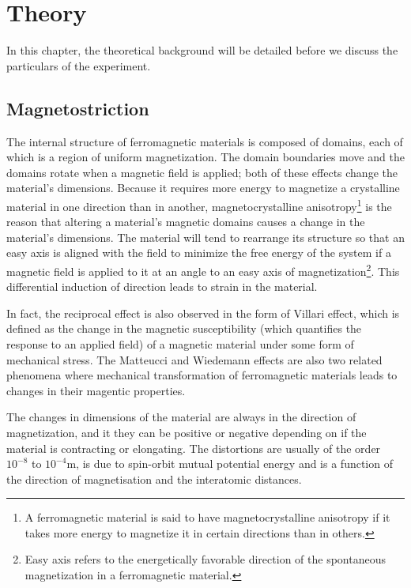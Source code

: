 \chapter{\label{method}Theory}
In this chapter, the theoretical background will be detailed before we discuss the particulars of the experiment.
\section{Magnetostriction}
The internal structure of ferromagnetic materials is composed of domains, each of which is a region of uniform magnetization. The domain boundaries move and the domains rotate when a magnetic field is applied; both of these effects change the material's dimensions. Because it requires more energy to magnetize a crystalline material in one direction than in another, magnetocrystalline anisotropy\footnote{A ferromagnetic material is said to have magnetocrystalline anisotropy if it takes more energy to magnetize it in certain directions than in others.} is the reason that altering a material's magnetic domains causes a change in the material's dimensions. The material will tend to rearrange its structure so that an easy axis is aligned with the field to minimize the free energy of the system if a magnetic field is applied to it at an angle to an easy axis of magnetization\footnote{Easy axis refers to the energetically favorable direction of the spontaneous magnetization in a ferromagnetic material.}. This differential induction of direction leads to strain in the material.

In fact, the reciprocal effect is also observed in the form of Villari effect, which is defined as the change in the magnetic susceptibility (which quantifies the response to an applied field) of a magnetic material under some form of mechanical stress. The Matteucci and Wiedemann effects are also two related phenomena where mechanical transformation of ferromagnetic materials leads to changes in their magentic properties.

The changes in dimensions of the material are always in the direction of magnetization, and it they can be positive or negative depending on if the material is contracting or elongating. The distortions are usually of the order $10^{-8}$ to $10^{-4} \si{\meter}$, is due to spin-orbit mutual potential energy and is a function of the direction of magnetisation and the interatomic distances.
